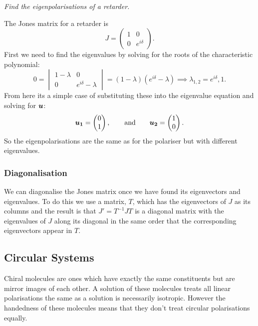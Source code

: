     \begin{example}
        \textit{Find the eigenpolarisations of a retarder.}
        
        The Jones matrix for a retarder is
        \[
            J =
            \begin{pmatrix}
                1 & 0\\
                0 & e^{i\delta}
            \end{pmatrix}
            .
        \]
        First we need to find the eigenvalues by solving for the roots of the characteristic polynomial:
        \[
            0 = 
            \begin{vmatrix}
                1 - \lambda & 0\\
                0 & e^{i\delta} - \lambda
            \end{vmatrix}
            = (1 - \lambda)(e^{i\delta} - \lambda) \implies \lambda_{1, 2} = e^{i\delta}, 1.
        \]
        From here its a simple case of substituting these into the eigenvalue equation and solving for \(\bm{u}\):
        \[
            \bm{u_1} = 
            \begin{pmatrix}
                0\\ 1
            \end{pmatrix}
            ,\qquad\text{and}\qquad \bm{u_2} =
            \begin{pmatrix}
                1\\ 0
            \end{pmatrix}
            .
        \]
        So the eigenpolarisations are the same as for the polariser but with different eigenvalues.
    \end{example}
    \subsubsection{Diagonalisation}
    We can diagonalise the Jones matrix once we have found its eigenvectors and eigenvalues.
    To do this we use a matrix, \(T\), which has the eigenvectors of \(J\) as its columns and the result is that \(J' = T^{-1}JT\) is a diagonal matrix with the eigenvalues of \(J\) along its diagonal in the same order that the corresponding eigenvectors appear in \(T\).
    
    \subsection{Circular Systems}
    Chiral molecules are ones which have exactly the same constituents but are mirror images of each other.
    A solution of these molecules treats all linear polarisations the same as a solution is necessarily isotropic.
    However the handedness of these molecules means that they don't treat circular polarisations equally.
    
